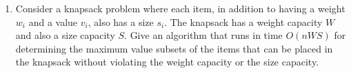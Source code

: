 \documentclass[11pt]{article}
\begin{document}
\begin{description}
\begin{enumerate}
\begin{comment}
\[i=0 \textrm{  :  } knap(i,j)=0\]

$knap(i,j)$ denotes the optimal value selected from the first $i$ items with weight capacity $j$.
Compared with the algorithm from the lecture, here we only gain a value of $v_i$ instead of $w_i$
when we select item $i$.

---------------------------
\end{comment}


\item Consider a knapsack problem where each item, in addition to having a weight $w_i$ and a
value $v_i$, also has a size $s_i$. The knapsack has a weight capacity $W$ and also a size capacity
$S$. Give an algorithm that runs in time $O(nWS)$ for determining the maximum value subsets of the
items that can be placed in the knapsack without violating the weight capacity or the size
capacity.

\begin{comment}
----------------------------

\noindent \textbf{Solution:}

To take item size into account, we need to construct and look up a 3-dimensional $n \times W \times
S$ table $knap(i,j,k)$.  It follows that the running time is $O(nWS)$.  Our dynamic programming
algorithm runs as follows.

\[i\geq1 \textrm{  :  } knap(i,j,k)=\left\{\begin{array}{ll} max\{knap(i-1,j,k),knap(i-1,j-w_i,k-s_i)+v_i\} & w_i\leq j \textrm{ and } s_j\leq k\\

knap(i-1,j,k) & w_i>j \textrm{ or } s_i>k

\end{array}\right.\]

\[i=0 \textrm{  :  } knap(i,j,k)=0\]

Compared with the algorithm from the lecture, here we can select item $i$ only if $w_i$ does not
exceed currently available weight capacity $j$ and $s_i$ does not exceed currently available size
capacity $k$.  If we select item $i$, the maximum value will be $v_i$ plus the maximum value
selected from the first $i-1$ items with weight capacity $j-w_i$ and size capacity $k-s_i$;  if we
do not select item $i$, the optimal solution will be selected from the first $i-1$ items with
weight capacity $j$ and size capacity $k$.  The optimal solution of the whole problem is the better
one of these two.
-----------------
\end{comment}


\end{enumerate}
\end{description}
\end{document}
